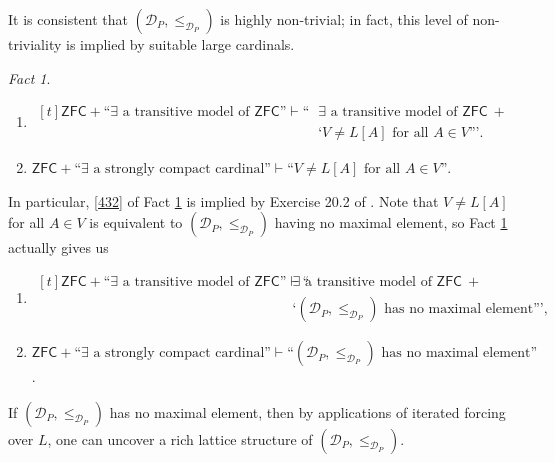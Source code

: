 \documentclass[12pt, twoside]{memoir}
\numberwithin{equation}{section}
\theoremstyle{definition}
\theoremstyle{remark}
\newtheorem{fact}[thm]{Fact}
\theoremstyle{definition}
\theoremstyle{definition}
\theoremstyle{definition}
\theoremstyle{remark}
\begin{document}
It is consistent that $(\mathcal{D}_P, \leq_{\mathcal{D}_P})$ is highly non-trivial; in fact, this level of non-triviality is implied by suitable large cardinals.

\begin{fact}\label{fact284}
\leavevmode
\begin{enumerate}[label=(\arabic*)]
    \item 
    \!
    $\begin{aligned}[t]
        \mathsf{ZFC} + \text{``} \exists \text{ a transitive model of } \mathsf{ZFC} \text{''} \vdash \text{``} & \exists \text{ a transitive model of } \mathsf{ZFC} \ + \\
        & \text{`} V \neq L[A] \text{ for all } A \in V \text{'''.}
    \end{aligned}$
    \item\label{432} $\mathsf{ZFC} + \text{``} \exists \text{ a strongly compact cardinal''} \vdash \text{``} V \neq L[A] \text{ for all } A \in V \text{''}$.
\end{enumerate}
\end{fact}

In particular, \ref{432} of Fact \ref{fact284} is implied by Exercise 20.2 of \cite{jech}. Note that $V \neq L[A]$ for all $A \in V$ is equivalent to $(\mathcal{D}_P, \leq_{\mathcal{D}_P})$ having no maximal element, so Fact \ref{fact284} actually gives us

\begin{enumerate}[label=(E\arabic*)]
    \item\label{e1}
    \!
    $\begin{aligned}[t]
        \mathsf{ZFC} + \text{``} \exists \text{ a transitive model of } \mathsf{ZFC} \text{''} \vdash \text{``} & \exists \text{ a transitive model of } \mathsf{ZFC} \ + \\
        & \text{`} (\mathcal{D}_P, \leq_{\mathcal{D}_P}) \text{ has no maximal element''',}
    \end{aligned}$
    \item $\mathsf{ZFC} + \text{``} \exists \text{ a strongly compact cardinal''} \vdash \text{``} (\mathcal{D}_P, \leq_{\mathcal{D}_P}) \text{ has no maximal element''}$.
\end{enumerate}
If $(\mathcal{D}_P, \leq_{\mathcal{D}_P})$ has no maximal element, then by applications of iterated forcing over $L$, one can uncover a rich lattice structure of $(\mathcal{D}_P, \leq_{\mathcal{D}_P})$.
\end{document}
